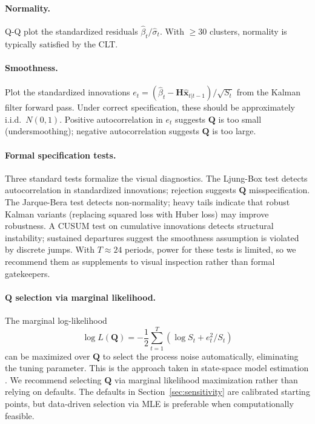\documentclass[12pt]{article}
\begin{document}
\paragraph{Normality.} Q-Q plot the standardized residuals $\hat{\beta}_t / \hat{\sigma}_t$. With $\geq 30$ clusters, normality is typically satisfied by the CLT.

\paragraph{Smoothness.} Plot the standardized innovations $e_t = (\hat{\beta}_t - \mathbf{H} \hat{\mathbf{x}}_{t|t-1}) / \sqrt{S_t}$ from the Kalman filter forward pass. Under correct specification, these should be approximately i.i.d.\ $N(0,1)$. Positive autocorrelation in $e_t$ suggests $\mathbf{Q}$ is too small (undersmoothing); negative autocorrelation suggests $\mathbf{Q}$ is too large.

\paragraph{Formal specification tests.} Three standard tests formalize the visual diagnostics. The Ljung-Box test detects autocorrelation in standardized innovations; rejection suggests $\mathbf{Q}$ misspecification. The Jarque-Bera test detects non-normality; heavy tails indicate that robust Kalman variants (replacing squared loss with Huber loss) may improve robustness. A CUSUM test on cumulative innovations detects structural instability; sustained departures suggest the smoothness assumption is violated by discrete jumps. With $T \approx 24$ periods, power for these tests is limited, so we recommend them as supplements to visual inspection rather than formal gatekeepers.

\paragraph{$\mathbf{Q}$ selection via marginal likelihood.} The marginal log-likelihood
\begin{equation}
\log L(\mathbf{Q}) = -\frac{1}{2} \sum_{t=1}^T \left( \log S_t + e_t^2 / S_t \right)
\end{equation}
can be maximized over $\mathbf{Q}$ to select the process noise automatically, eliminating the tuning parameter. This is the approach taken in state-space model estimation \citep{durbin2012time}. We recommend selecting $\mathbf{Q}$ via marginal likelihood maximization rather than relying on defaults. The defaults in Section~\ref{sec:sensitivity} are calibrated starting points, but data-driven selection via MLE is preferable when computationally feasible.
\end{document}
